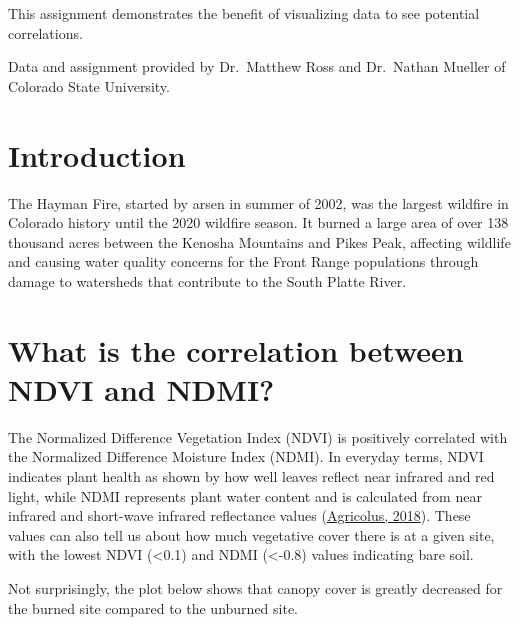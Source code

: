 \documentclass[
]{book}
\begin{document}
This assignment demonstrates the benefit of visualizing data to see potential correlations.

Data and assignment provided by Dr.~Matthew Ross and Dr.~Nathan Mueller of Colorado State University.

\hypertarget{introduction-1}{%
\section{Introduction}\label{introduction-1}}

The Hayman Fire, started by arsen in summer of 2002, was the largest wildfire in Colorado history until the 2020 wildfire season. It burned a large area of over 138 thousand acres between the Kenosha Mountains and Pikes Peak, affecting wildlife and causing water quality concerns for the Front Range populations through damage to watersheds that contribute to the South Platte River.

\hypertarget{what-is-the-correlation-between-ndvi-and-ndmi}{%
\section{What is the correlation between NDVI and NDMI?}\label{what-is-the-correlation-between-ndvi-and-ndmi}}

The Normalized Difference Vegetation Index (NDVI) is positively correlated with the Normalized Difference Moisture Index (NDMI). In everyday terms, NDVI indicates plant health as shown by how well leaves reflect near infrared and red light, while NDMI represents plant water content and is calculated from near infrared and short-wave infrared reflectance values (\href{https://www.agricolus.com/en/vegetation-indices-ndvi-ndmi/}{Agricolus, 2018}). These values can also tell us about how much vegetative cover there is at a given site, with the lowest NDVI (\textless0.1) and NDMI (\textless-0.8) values indicating bare soil.

Not surprisingly, the plot below shows that canopy cover is greatly decreased for the burned site compared to the unburned site.
\end{document}
